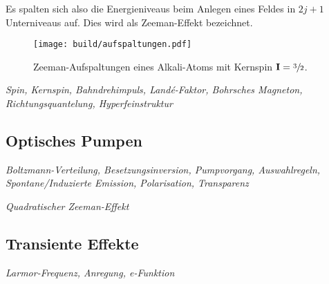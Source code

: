 Es spalten sich also die Energieniveaus beim Anlegen eines Feldes in $2j + 1$ Unterniveaus auf.
Dies wird als Zeeman-Effekt bezeichnet.




\begin{figure}[ht]
  \centering
  \texttt{[image: build/aufspaltungen.pdf]}
  \caption{%
    Zeeman-Aufspaltungen eines Alkali-Atoms mit Kernspin $\mathbf{I}
    = \sfrac{3}{2}$.\cite{anleitung}%
  }%
  \label{fig:aufspaltungen}
\end{figure}

\textit{Spin, Kernspin, Bahndrehimpuls, Land\'e-Faktor, Bohrsches Magneton,
Richtungsquantelung, Hyperfeinstruktur}

\subsection{Optisches Pumpen}%
\label{sub:optisches_pumpen}

\textit{Boltzmann-Verteilung, Besetzungsinversion, Pumpvorgang, Auswahlregeln,
Spontane/Induzierte Emission, Polarisation, Transparenz}

\textit{Quadratischer Zeeman-Effekt}


\subsection{Transiente Effekte}%
\label{sub:transiente_effekte}

\textit{Larmor-Frequenz, Anregung, e-Funktion}
